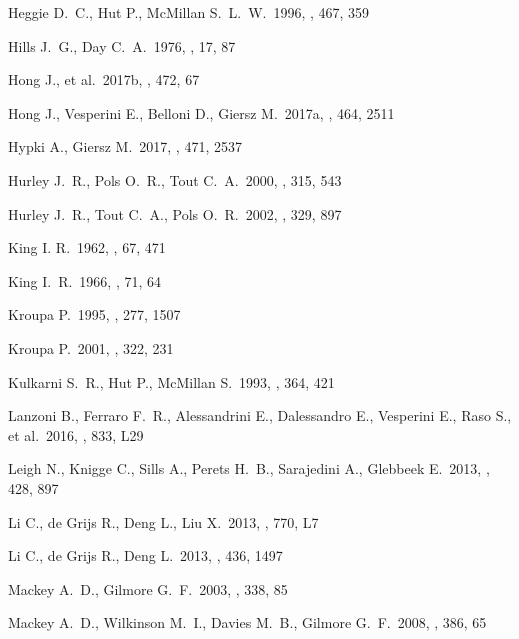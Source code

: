\documentclass[useAMS,usenatbib,twocolumn]{mnras}
\begin{document}
\begin{thebibliography}{57}
 Heggie D.~C., Hut P., McMillan S.~L.~W.\ 1996, \apj, 467, 359 

 Hills J.~G., Day C.~A.\ 1976, \aplett, 17, 87 

 Hong J., et al.\ 2017b, \mnras, 472, 67 

 Hong J., Vesperini E., Belloni D., Giersz M.\ 2017a, \mnras, 464, 2511 

 Hypki A., Giersz M.\ 2017, \mnras, 471, 2537 

 Hurley J.~R., Pols O.~R., Tout C.~A.\ 2000, \mnras, 315, 543 

 Hurley J.~R., Tout C.~A., Pols O.~R.\ 2002, \mnras, 329, 897 

 King I. R.\ 1962, \aj, 67, 471 

 King I.~R.\ 1966, \aj, 71, 64 

 Kroupa P.\ 1995, \mnras, 277,  1507

 Kroupa P.\ 2001, \mnras, 322, 231 

 Kulkarni S.~R., Hut P., McMillan S.\ 1993, \nat, 364, 421 

 Lanzoni B., Ferraro F.~R., Alessandrini E., Dalessandro E., Vesperini E., Raso S., et al.\ 2016, \apjl, 833, L29 

 Leigh N., Knigge C., Sills A., Perets H.~B., Sarajedini A., Glebbeek E.\ 2013, \mnras, 428, 897 

 Li C., de Grijs R., Deng L., Liu X.\ 2013, \apjl, 770, L7 

 Li C., de Grijs R., Deng L.\ 2013, \mnras, 436, 1497 

 Mackey A.~D., Gilmore G.~F.\ 2003, \mnras, 338, 85 

 Mackey A.~D., Wilkinson M.~I., Davies M.~B., Gilmore G.~F.\ 2008, \mnras, 386, 65 


\end{thebibliography}
\end{document}
